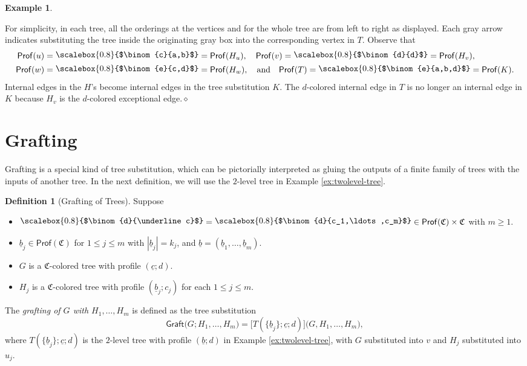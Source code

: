 \documentclass[11pt]{amsbook}
\numberwithin{section}{chapter}
\numberwithin{subsection}{section}
\numberwithin{equation}{section}
\theoremstyle{plain}
\theoremstyle{definition}
\newtheorem{definition}[equation]{Definition}
\newtheorem{example}[equation]{Example}
\newcommand{\colorc}{\mathfrak{C}}
\newcommand{\graft}{\mathsf{Graft}}
\newcommand{\Prof}{\mathsf{Prof}}
\newcommand{\Profc}{\Prof(\colorc)}
\newcommand{\Profcc}{\Profc \times \colorc}
\newcommand{\profofhv}{\Prof(H_v)}
\newcommand{\profofk}{\Prof(K)}
\newcommand{\profoft}{\Prof(T)}
\newcommand{\profofu}{\Prof(u)}
\newcommand{\profofv}{\Prof(v)}
\newcommand{\profofw}{\Prof(w)}
\newcommand{\dqed}{\hfill$\diamond$}
\newcommand{\ub}{\underline b}
\newcommand{\uc}{\underline c}
\newcommand{\smallprof}[1]
{\raisebox{.05cm}{\scalebox{0.8}{#1}}}
\newcommand{\sbinom}[2]{\raisebox{.05cm}{\scalebox{0.8}{$\binom{#1}{#2}$}}}
\newcommand{\duc}{\smallprof{$\binom{d}{\uc}$}}
\newcommand{\dconecm}{\smallprof{$\binom{d}{c_1,\ldots,c_m}$}}
\newcommand{\dd}{\smallprof{$\binom{d}{d}$}}
\newcommand{\andspace}{\quad\text{and}\quad}
\begin{document}
\begin{example}
\begin{center}
\end{center}
For simplicity, in each tree, all the orderings at the vertices and for the whole tree are from left to right as displayed.  Each gray arrow indicates substituting the tree inside the originating gray box into the corresponding vertex in $T$.  Observe that 
\[\begin{split}\profofu&=\sbinom{c}{a,b}=\Prof(H_u),\quad \profofv=\dd=\profofhv,\\
\profofw&=\sbinom{e}{c,d}=\Prof(H_w),\andspace \profoft=\sbinom{e}{a,b,d}=\profofk.\end{split}\]
Internal edges in the $H$'s become internal edges in the tree substitution $K$.  The $d$-colored internal edge in $T$ is no longer an internal edge in $K$ because $H_v$ is the $d$-colored exceptional edge.\dqed
\end{example}

\section{Grafting}\label{sec:grafting}

Grafting is a special kind of tree substitution, which can be pictorially interpreted as gluing the outputs of a finite family of trees with the inputs of another tree.  In the next definition, we will use the $2$-level tree in Example \ref{ex:twolevel-tree}.

\begin{definition}[Grafting of Trees]\label{def:grafting}
Suppose 
\begin{itemize}\item $\duc=\dconecm \in \Profcc$ with $m\geq 1$.
\item $\ub_j \in \Profc$ for $1 \leq j \leq m$ with $|\ub_j|=k_j$, and $\ub=(\ub_1,\ldots,\ub_m)$. 
\item $G$ is a $\colorc$-colored tree with profile $(\uc;d)$.
\item $H_j$ is a $\colorc$-colored tree with profile $(\ub_j;c_j)$ for each $1 \leq j \leq m$.  
\end{itemize}
The \emph{grafting of $G$ with $H_1,\ldots,H_m$} is defined as the tree substitution\label{notation:grafting}
\[\graft\bigl(G;H_1,\ldots,H_m\bigr) = \bigl[T\left(\{\ub_j\};\uc;d\right)\bigr]\bigl(G,H_1,\ldots,H_m\bigr),\]
where $T\left(\{\ub_j\};\uc;d\right)$ is the $2$-level tree with profile $(\ub;d)$ in Example \ref{ex:twolevel-tree}, with $G$ substituted into $v$ and $H_j$ substituted into $u_j$.
\end{definition}
\end{document}
